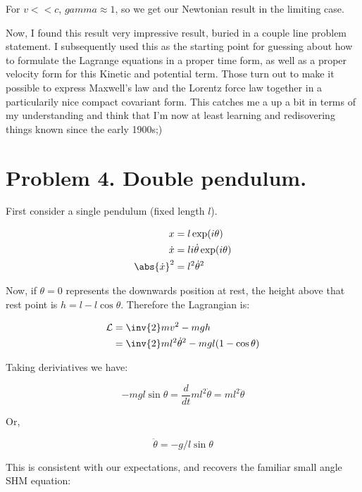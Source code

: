 \documentclass{article}
\newcommand{\LL}[0]{\mathcal{L}}
\newcommand{\dottheta}[0]{\dot{\theta}}
\newcommand{\ddottheta}[0]{\ddot{\theta}}
\newcommand{\xdot}[0]{\dot{x}}
\begin{document}
For $v << c$, $gamma \approx 1$, so we get our Newtonian result in the limiting case.

Now, I found this result very impressive result, buried in a couple line problem statement.  I subsequently used this as the starting point for guessing about how to formulate the Lagrange equations in a proper time form, as well as a proper velocity form for this Kinetic and potential term.  Those turn out to make it possible to express
Maxwell's law and the Lorentz force law together in a particularily nice compact covariant form.  This catches me a up a bit in terms of my understanding and think that I'm now at least learning and redisovering things known since the early 1900s;)

\section{ Problem 4. Double pendulum. }

First consider a single pendulum (fixed length $l$).

\begin{align*}
x &= l \exp(i\theta) \\
\xdot &= l i \dottheta \exp(i\theta) \\
\abs{\xdot}^2 &= l^2 \dottheta^2 \\
\end{align*}

Now, if $\theta = 0$ represents the downwards position at rest, the height above that rest point is $h = l - l \cos\theta$.  Therefore the Lagrangian is:

\begin{align*}
\LL 
&= \inv{2} m v^2 - mgh \\
&= \inv{2} m l^2 \dottheta^2 - mg l (1 - \cos\theta) \\
\end{align*}

Taking deriviatives we have:

\begin{equation*}
-m g l \sin\theta = \frac{d}{dt} m l^2 \dottheta = m l^2 \ddottheta
\end{equation*}

Or,

\begin{equation}
\ddottheta = - g/l \sin\theta 
\end{equation}

This is consistent with our expectations, and recovers the familiar small angle SHM equation:
\end{document}
